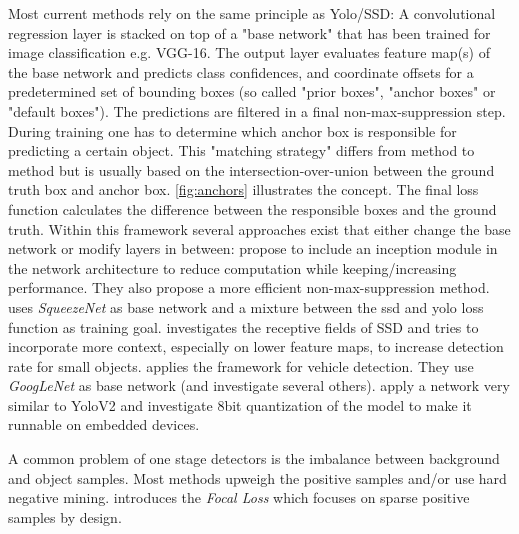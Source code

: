 	Most current methods rely on the same principle as Yolo/SSD: A convolutional regression layer is stacked on top of a "base network" that has been trained for image classification e.g. VGG-16. The output layer evaluates feature map(s) of the base network and predicts class confidences, and coordinate offsets for a predetermined set of bounding boxes (so called "prior boxes", "anchor boxes" or "default boxes"). The predictions are filtered in a final non-max-suppression step. During training one has to determine which anchor box is responsible for predicting a certain object. This "matching strategy" differs from method to method but is usually based on the intersection-over-union between the ground truth box and anchor box. \autoref{fig:anchors} illustrates the concept. The final loss function calculates the difference between the responsible boxes and the ground truth. 
	Within this framework several approaches exist that either change the base network or modify layers in between: \cite{ChengchengNing2017} propose to include an inception module in the network architecture to reduce computation while keeping/increasing performance. They also propose a more efficient non-max-suppression method. \cite{Wu} uses \textit{SqueezeNet} as base network and a mixture between the ssd and yolo loss function as training goal. \cite{Xiang} investigates the receptive fields of SSD and tries to incorporate more context, especially on lower feature maps, to increase detection rate for small objects.\cite{Linb} applies the framework for vehicle detection. They use \textit{GoogLeNet} as base network (and investigate several others).\cite{TripathiSanDiego} apply a network very similar to YoloV2 and investigate 8bit quantization of the model to make it runnable on embedded devices.
	
	A common problem of one stage detectors is the imbalance between background and object samples. Most methods upweigh the positive samples and/or use hard negative mining. \cite{Lin} introduces the \textit{Focal Loss} which focuses on sparse positive samples by design.
	

